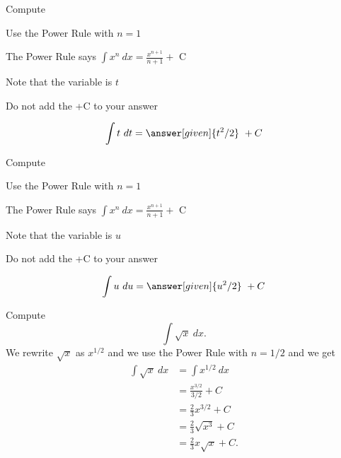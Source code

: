 \documentclass{ximera}
\begin{document}
\begin{problem} %
Compute 

\begin{hint}
Use the Power Rule with $n=1$
\end{hint}
\begin{hint}
The Power Rule says $\int x^n \ dx = \frac{x^{n+1}}{n+1} +$ C
\end{hint}
\begin{hint}
Note that the variable is $t$
\end{hint}
\begin{hint}
\begin{center}
Do not add the +C to your answer
\end{center}
\end{hint}

\[
\int t \ dt =
\answer[given]{t^2 /2} \ + C
\]
\end{problem}



\begin{problem} %
Compute 

\begin{hint}
Use the Power Rule with $n=1$
\end{hint}
\begin{hint}
The Power Rule says $\int x^n \ dx = \frac{x^{n+1}}{n+1} +$ C
\end{hint}
\begin{hint}
Note that the variable is $u$
\end{hint}
\begin{hint}
\begin{center}
Do not add the +C to your answer
\end{center}
\end{hint}

\[
\int u \ du =
\answer[given]{u^2 /2} \ + C
\]
\end{problem}


\begin{example} %
Compute $$\int \sqrt x \ dx.$$
We rewrite $\sqrt x$ as $x^{1/2}$ and we use the Power Rule with $n= 1/2$ and we get
\begin{align*}
\int \sqrt x \ dx &= \int x^{1/2} \ dx\\
&= \frac{x^{3/2}}{3/2} + C\\
&= \tfrac{2}{3}x^{3/2} + C\\ 
&= \tfrac23 \sqrt {x^3} + C\\
&= \tfrac23 x\sqrt {x} + C.
\end{align*}
\end{example}
\end{document}
